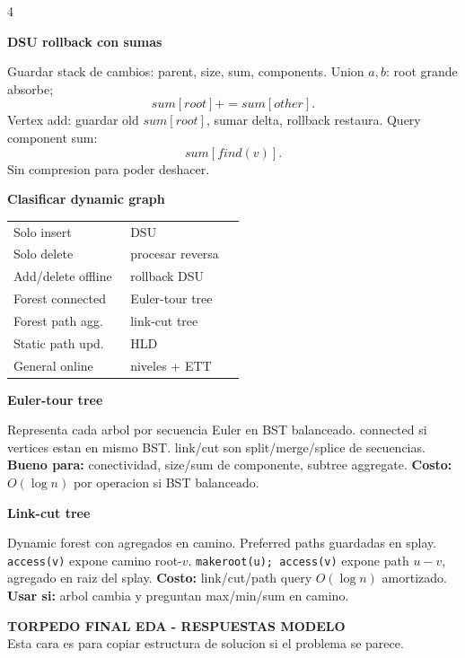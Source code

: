 \documentclass[8pt]{extarticle}
\newcommand{\blk}[2]{%
  \vspace{1.3pt}
  \noindent\colorbox{head}{\parbox{\linewidth-2\fboxsep}{\textbf{#1}}}\par
  {\footnotesize #2}\par
}
\newcommand{\mini}[1]{{\scriptsize #1}}
\newcommand{\bigO}{O}
\begin{document}
\begin{multicols}{4}
\blk{DSU rollback con sumas}{
Guardar stack de cambios: parent, size, sum, components.
Union \(a,b\): root grande absorbe; 
\[
sum[root]+=sum[other].
\]
Vertex add: guardar old \(sum[root]\), sumar delta, rollback restaura.
Query component sum:
\[
sum[find(v)].
\]
Sin compresion para poder deshacer.}

\blk{Clasificar dynamic graph}{
\begin{tabular}{@{}p{0.48\linewidth}p{0.47\linewidth}@{}}
Solo insert & DSU\\
Solo delete & procesar reversa\\
Add/delete offline & rollback DSU\\
Forest connected & Euler-tour tree\\
Forest path agg. & link-cut tree\\
Static path upd. & HLD\\
General online & niveles + ETT
\end{tabular}}

\blk{Euler-tour tree}{
Representa cada arbol por secuencia Euler en BST balanceado. connected si vertices estan en mismo BST. link/cut son split/merge/splice de secuencias.
\textbf{Bueno para:} conectividad, size/sum de componente, subtree aggregate.
\textbf{Costo:} \(\bigO(\log n)\) por operacion si BST balanceado.}

\blk{Link-cut tree}{
Dynamic forest con agregados en camino. Preferred paths guardadas en splay. \texttt{access(v)} expone camino root-\(v\). \texttt{makeroot(u); access(v)} expone path \(u-v\), agregado en raiz del splay.
\textbf{Costo:} link/cut/path query \(\bigO(\log n)\) amortizado.
\textbf{Usar si:} arbol cambia y preguntan max/min/sum en camino.}

\end{multicols}
\newpage

\begin{center}
{\Large \textbf{TORPEDO FINAL EDA - RESPUESTAS MODELO}}\\[-1pt]
\mini{Esta cara es para copiar estructura de solucion si el problema se parece.}
\end{center}
\end{document}
